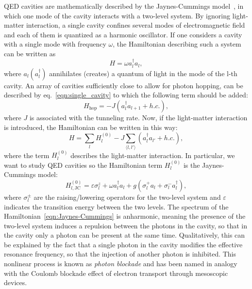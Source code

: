 QED cavities are mathematically described by the Jaynes-Cummings mo\-del~\cite{shore_knight}, in which one mode of the cavity interacts with a two-level system. By ignoring light-matter interaction, a single cavity confines several modes of electromagnetic field and each of them is quantized as a harmonic oscillator. If one considers a cavity with a single mode with frequency $\omega$, the Hamiltonian describing such a system can be written as
\begin{equation}
\label{eqn:single_cavity}
    H = \omega a^{\dagger}_la_l,
\end{equation}
where $a_l (a_l^{\dagger})$ annihilates (creates) a quantum of light in the mode of the l-th cavity.
An array of cavities sufficiently close to allow for photon hopping, can be described by eq.~\ref{eqn:single_cavity} to which the following term should be added:
\begin{equation}
    H_{\text{hop}} = -J (a^{\dagger}_la_{l+1} + h.c.),
\end{equation}
where $J$ is associated with the tunneling rate.
Now, if the light-matter interaction is introduced, the Hamiltonian can be written in this way:
\begin{equation}
    H = \sum_l H_l^{(0)} - J \sum_{\langle l, l' \rangle}(a^{\dagger}_la_{l'} + h.c.),
\end{equation}
where the term $H_l^{(0)}$ describes the light-matter interaction. In particular, we want to study QED cavities so the Hamiltonian term $H_l^{(0)}$ is the Jaynes-Cummings model:
\begin{equation}
\label{eqn:Jaynes-Cummings}
    H_{l,\text{JC}}^{(0)} = \varepsilon \sigma^z_l + \omega a^{\dagger}_la_l + g(\sigma^+_l a_l + \sigma^-_l a_l^{\dagger}),
\end{equation}
where $\sigma^\pm_l$ are the raising/lowering operators for the two-level system and $\varepsilon$ indicates the transition energy between the two levels.
The spectrum of the Hamiltonian~\ref{eqn:Jaynes-Cummings} is anharmonic, meaning the presence of the two-level system induces a repulsion between the photons in the cavity, so that in the cavity only a photon can be present at the same time. Qualitatively, this can be explained by the fact that a single photon in the cavity modifies the effective resonance frequency, so that the injection of another photon is inhibited. This nonlinear process is known as \emph{photon blockade} and has been named in analogy with the Coulomb blockade effect of electron transport through mesoscopic devices.


